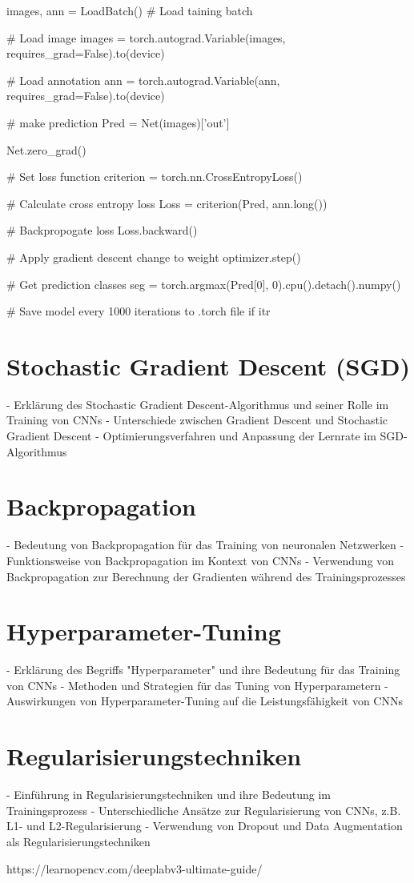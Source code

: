     images, ann = LoadBatch()  # Load taining batch

    # Load image
    images = torch.autograd.Variable(images, requires_grad=False).to(device)

    # Load annotation
    ann = torch.autograd.Variable(ann, requires_grad=False).to(device)

    # make prediction
    Pred = Net(images)['out']

    Net.zero_grad()

    # Set loss function
    criterion = torch.nn.CrossEntropyLoss()

    # Calculate cross entropy loss
    Loss = criterion(Pred, ann.long())

    # Backpropogate loss
    Loss.backward()

    # Apply gradient descent change to weight
    optimizer.step()

    # Get  prediction classes
    seg = torch.argmax(Pred[0], 0).cpu().detach().numpy()
    
    # Save model every 1000 iterations to .torch file
    if itr %

\section{Stochastic Gradient Descent (SGD)}
- Erklärung des Stochastic Gradient Descent-Algorithmus und seiner Rolle im Training von CNNs
- Unterschiede zwischen Gradient Descent und Stochastic Gradient Descent
- Optimierungsverfahren und Anpassung der Lernrate im SGD-Algorithmus

\section{Backpropagation}
- Bedeutung von Backpropagation für das Training von neuronalen Netzwerken
- Funktionsweise von Backpropagation im Kontext von CNNs
- Verwendung von Backpropagation zur Berechnung der Gradienten während des Trainingsprozesses

\section{Hyperparameter-Tuning}
- Erklärung des Begriffs "Hyperparameter" und ihre Bedeutung für das Training von CNNs
- Methoden und Strategien für das Tuning von Hyperparametern
- Auswirkungen von Hyperparameter-Tuning auf die Leistungsfähigkeit von CNNs

\section{Regularisierungstechniken}
- Einführung in Regularisierungstechniken und ihre Bedeutung im Trainingsprozess
- Unterschiedliche Ansätze zur Regularisierung von CNNs, z.B. L1- und L2-Regularisierung
- Verwendung von Dropout und Data Augmentation als Regularisierungstechniken








https://learnopencv.com/deeplabv3-ultimate-guide/